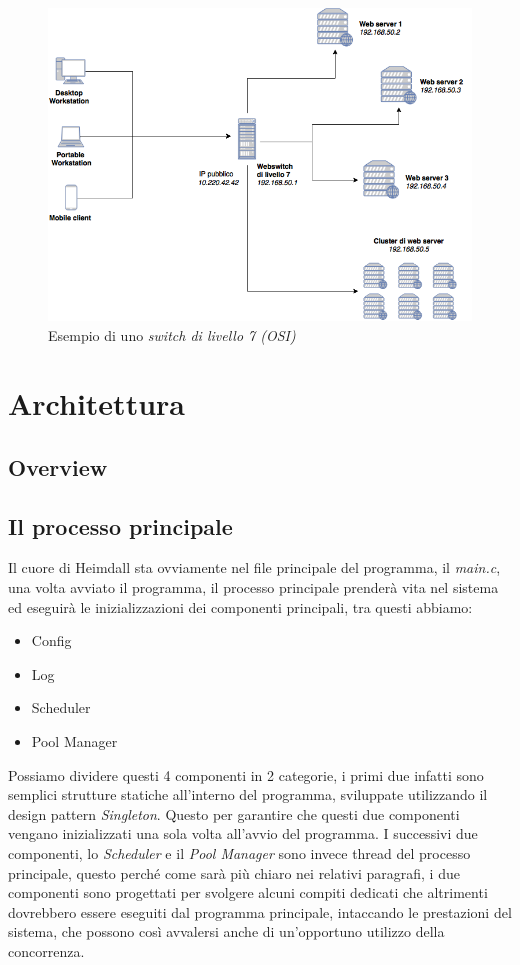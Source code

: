 \documentclass[italian]{tktltiki2}
\begin{document}
\begin{figure}
\centering
\includegraphics[width=\textwidth]{images/switch7}
\caption{Esempio di uno \emph{switch di livello 7 (OSI)}}
\end{figure}

\newpage
\section{Architettura}
\label{sec:architecture}

\subsection{Overview}
\label{ssec:overview}

\subsection{Il processo principale}
\label{ssec:main_process}
Il cuore di Heimdall sta ovviamente nel file principale del programma, il \emph{main.c}, una volta avviato il programma, il processo principale prenderà vita nel sistema ed eseguirà le inizializzazioni dei componenti principali, tra questi abbiamo:

\begin{itemize}
  \item Config
  \item Log
  \item Scheduler
  \item Pool Manager
\end{itemize}
Possiamo dividere questi 4 componenti in 2 categorie, i primi due infatti sono semplici strutture statiche all'interno del programma, sviluppate utilizzando il design pattern \emph{Singleton}. Questo per garantire che questi due componenti vengano inizializzati una sola volta all'avvio del programma. I successivi due componenti, lo \emph{Scheduler} e il \emph{Pool Manager} sono invece thread del processo principale, questo perché come sarà più chiaro nei relativi paragrafi, i due componenti sono progettati per svolgere alcuni compiti dedicati che altrimenti dovrebbero essere eseguiti dal programma principale, intaccando le prestazioni del sistema, che possono così avvalersi anche di un'opportuno utilizzo della concorrenza.
\end{document}
